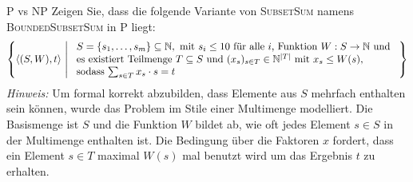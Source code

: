 \documentclass[answers]{submit}
\begin{document}
\exerciseheader
\exercisetitle

\begin{exercise}[6]{P vs NP}
  Zeigen Sie, dass die folgende Variante von \textsc{SubsetSum} namens \textsc{BoundedSubsetSum} in P liegt:
  \[
    \set{\dtm[(S,W),t]}{
      \begin{array}{l}
        S=\{s_1,\dots,s_m\}\subseteq \N, \text{ mit $s_i\le 10$ für alle $i$, Funktion $W:S\rightarrow \N$ und } \\
        \text{es existiert Teilmenge $T\subseteq S$ und $(x_s)_{s\in T}\in\N^{\abs{T}}$ mit $x_s \le W(s)$,}     \\
        \text{sodass $\sum_{s\in T}x_s\cdot s =t$}
      \end{array}
    }
  \]
  \emph{Hinweis:} Um formal korrekt abzubilden, dass Elemente aus $S$ mehrfach enthalten sein können, wurde das Problem im Stile einer Multimenge modelliert.
  Die Basismenge ist $S$ und die Funktion $W$ bildet ab, wie oft jedes Element $s\in S$ in der Multimenge enthalten ist.
  Die Bedingung über die Faktoren $x$ fordert, dass ein Element $s\in T$ maximal $W(s)$ mal benutzt wird um das Ergebnis $t$ zu erhalten.

\end{exercise}
\end{document}
